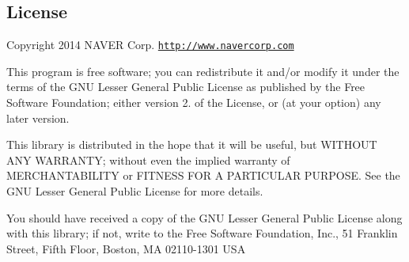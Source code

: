 \subsection*{License}

Copyright 2014 N\+A\+V\+E\+R Corp. \href{http://www.navercorp.com}{\tt http\+://www.\+navercorp.\+com}

This program is free software; you can redistribute it and/or modify it under the terms of the G\+N\+U Lesser General Public License as published by the Free Software Foundation; either version 2. of the License, or (at your option) any later version.

This library is distributed in the hope that it will be useful, but W\+I\+T\+H\+O\+U\+T A\+N\+Y W\+A\+R\+R\+A\+N\+T\+Y; without even the implied warranty of M\+E\+R\+C\+H\+A\+N\+T\+A\+B\+I\+L\+I\+T\+Y or F\+I\+T\+N\+E\+S\+S F\+O\+R A P\+A\+R\+T\+I\+C\+U\+L\+A\+R P\+U\+R\+P\+O\+S\+E. See the G\+N\+U Lesser General Public License for more details.

You should have received a copy of the G\+N\+U Lesser General Public License along with this library; if not, write to the Free Software Foundation, Inc., 51 Franklin Street, Fifth Floor, Boston, M\+A 02110-\/1301 U\+S\+A 